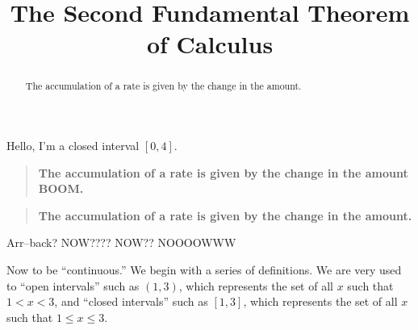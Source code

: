 \documentclass{ximera}
\title[Dig-In:]{The Second Fundamental Theorem of Calculus}
\begin{document}
\begin{abstract}
The accumulation of a rate is given by the change in the amount.
\end{abstract}
\maketitle


Hello, I'm a closed interval $[0,4]$.

\begin{quote}\large\textbf{The \textcolor{green!70!black!70!blue}{accumulation} of a \textcolor{blue!70!green}{rate} is given by the \textcolor{purple!50!blue!90!black}{change in the amount BOOM}.}
\end{quote}
% 
\begin{quote}\large\textbf{The accumulation of a rate is given by the change in the amount.}
\end{quote}

Arr--back? NOW???? NOW?? NOOOOWWW

Now to be ``continuous.'' We begin with a series of definitions. We are
very used to ``open intervals'' such as $(1,3)$, which represents the set
of all $x$ such that $1<x<3$, and ``closed intervals'' such as
$[1,3]$, which represents the set of all $x$ such that $1\leq x\leq
3$. 
\end{document}
